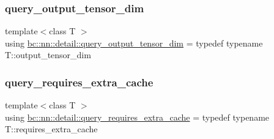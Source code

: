 \mbox{\label{namespacebc_1_1nn_1_1detail_aa16772b430fc14eb1bf4b82ad6f679fd}} 
\subsubsection{\texorpdfstring{query\+\_\+output\+\_\+tensor\+\_\+dim}{query\_output\_tensor\_dim}}
{\footnotesize\ttfamily template$<$class T $>$ \\
using \hyperlink{namespacebc_1_1nn_1_1detail_aa16772b430fc14eb1bf4b82ad6f679fd}{bc\+::nn\+::detail\+::query\+\_\+output\+\_\+tensor\+\_\+dim} = typedef typename T\+::output\+\_\+tensor\+\_\+dim}

\mbox{\label{namespacebc_1_1nn_1_1detail_a7cfff1896ea5ef55f6410bb7c6ff3bf3}} 
\subsubsection{\texorpdfstring{query\+\_\+requires\+\_\+extra\+\_\+cache}{query\_requires\_extra\_cache}}
{\footnotesize\ttfamily template$<$class T $>$ \\
using \hyperlink{namespacebc_1_1nn_1_1detail_a7cfff1896ea5ef55f6410bb7c6ff3bf3}{bc\+::nn\+::detail\+::query\+\_\+requires\+\_\+extra\+\_\+cache} = typedef typename T\+::requires\+\_\+extra\+\_\+cache}

